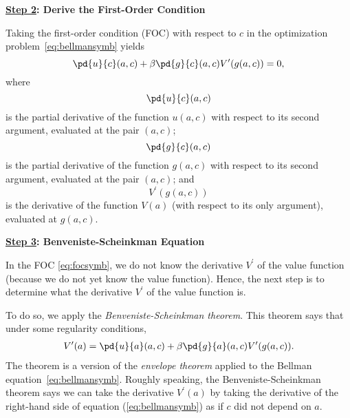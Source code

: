 \documentclass[\topdir/lecture\_notes.tex]{subfiles}
\begin{document}
\textbf{\underline{Step 2}: Derive the First-Order Condition}

Taking the first-order condition (FOC) with respect to $c$ in the optimization problem~\eqref{eq:bellmansymb} yields 
\begin{equation}
\pd{u}{c}(a,c)+\beta \pd{g}{c}(a,c) V^\prime(g(a,c))=0,\label{eq:focsymb}
\end{equation}
where
\[\pd{u}{c}(a,c)\]
is the partial derivative of the function $u(a,c)$ with respect to its second argument, evaluated at the pair $(a,c)$;
\[\pd{g}{c}(a,c)\]
is the partial derivative of the function $g(a,c)$ with respect to its second argument, evaluated at the pair $(a,c)$;
and 
\[V^\prime(g(a,c))\]
is the derivative of the function $V(a)$ (with respect to its only argument), evaluated at $g(a,c)$.

\textbf{\underline{Step 3}: Benveniste-Scheinkman Equation}

In the FOC \eqref{eq:focsymb}, we do not know the derivative $V^\prime$ of the value function (because we do not yet know the value function). Hence, the next step is to determine what the derivative $V^\prime$ of the value function is. 


To do so, we apply the \emph{Benveniste-Scheinkman theorem}. This theorem says that under some regularity conditions,
\begin{align}
V^\prime(a)=\pd{u}{a}(a,c)+\beta \pd{g}{a}(a,c) V^\prime(g(a,c)).\label{eq:BSET}
\end{align}
The theorem is a version of the \emph{envelope theorem} applied to the Bellman equation~\eqref{eq:bellmansymb}. Roughly speaking, the Benveniste-Scheinkman theorem says we can take the derivative 
$V^\prime(a)$ by taking the derivative of the right-hand side of equation (\ref{eq:bellmansymb}) as if $c$ did not depend on $a$.
\end{document}
